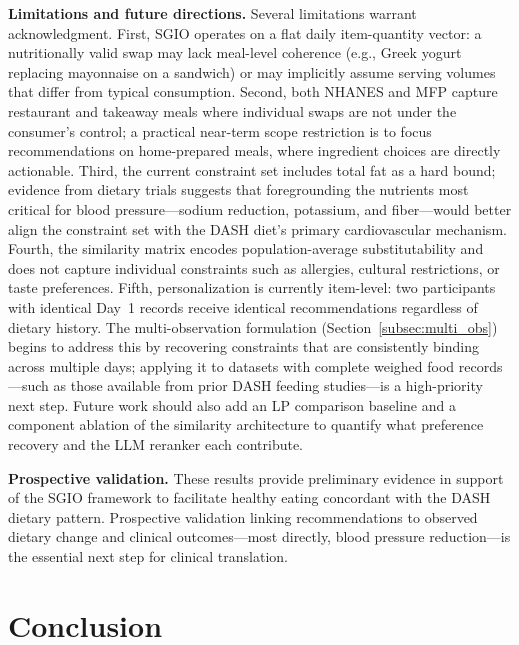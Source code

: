 \documentclass[journal]{IEEEtran}
\begin{document}
\textbf{Limitations and future directions.}
Several limitations warrant acknowledgment. First, SGIO operates on a
flat daily item-quantity vector: a nutritionally valid swap may lack
meal-level coherence (e.g., Greek yogurt replacing mayonnaise on a
sandwich) or may implicitly assume serving volumes that differ from
typical consumption. Second, both NHANES and MFP capture restaurant and
takeaway meals where individual swaps are not under the consumer's
control; a practical near-term scope restriction is to focus
recommendations on home-prepared meals, where ingredient choices are
directly actionable. Third, the current constraint set includes total
fat as a hard bound; evidence from dietary trials suggests that
foregrounding the nutrients most critical for blood pressure---sodium
reduction, potassium, and fiber---would better align the constraint set
with the DASH diet's primary cardiovascular mechanism. Fourth, the
similarity matrix encodes population-average substitutability and does
not capture individual constraints such as allergies, cultural
restrictions, or taste preferences. Fifth, personalization is currently
item-level: two participants with identical Day~1 records receive
identical recommendations regardless of dietary history. The
multi-observation formulation (Section~\ref{subsec:multi_obs}) begins
to address this by recovering constraints that are consistently binding
across multiple days; applying it to datasets with complete weighed food
records---such as those available from prior DASH feeding
studies---is a high-priority next step. Future work should also add an
LP comparison baseline and a component ablation of the similarity
architecture to quantify what preference recovery and the LLM reranker
each contribute.

\textbf{Prospective validation.}
These results provide preliminary evidence in support of the SGIO
framework to facilitate healthy eating concordant with the DASH dietary
pattern. Prospective validation linking recommendations to observed
dietary change and clinical outcomes---most directly, blood pressure
reduction---is the essential next step for clinical translation.

\section{Conclusion}
\label{sec:conclusion}
\end{document}
